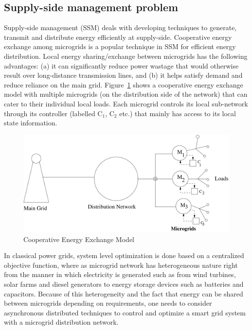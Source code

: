 \subsection{Supply-side management problem}
 Supply-side management (SSM)\cite{} deals with developing techniques to  generate, transmit and distribute energy efficiently at supply-side. Cooperative energy exchange among microgrids is a popular technique in SSM for efficient energy distribution.  Local energy sharing/exchange between microgrids has the
following advantages:
(a) it can significantly reduce power wastage that would
otherwise result over long-distance transmission lines, and (b) it
helps satisfy demand and reduce reliance on the main grid. 
 Figure~\ref{gridmodel} shows a cooperative energy exchange model with multiple microgrids
(on the distribution side of the network) that can cater to their individual
local loads. Each microgrid controls its local sub-network through its controller (labelled
$\mbox{C}_1$, $\mbox{C}_2$ etc.) that mainly has access to its local state information.


\begin{figure}[thpb]
      \centering
      \includegraphics[scale=0.4]{powergrid2.pdf}
      \caption{Cooperative Energy Exchange Model}
      \label{gridmodel}
\end{figure}

 In classical power grids, system level optimization is done based on a centralized
objective function, where as 
microgrid network has heterogeneous nature right from the manner in which electricity
is generated such as from wind turbines, solar farms and diesel generators
to energy storage devices such as batteries and capacitors.
 Because of this heterogeneity and the fact that energy can be shared between microgrids depending
on requirements, one needs to consider asynchronous distributed techniques 
 to control and optimize a smart grid system
with a microgrid distribution network.



